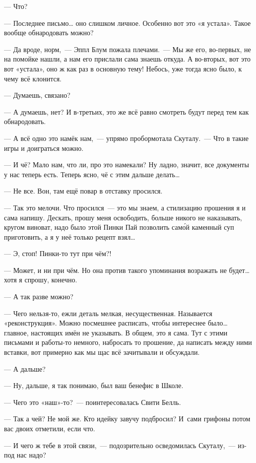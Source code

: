 \documentclass[fontsize=11pt,a5paper,titlepage=firstcover]{scrbook}
\begin{document}
--- Что?

--- Последнее письмо{\ldots} оно слишком личное. Особенно вот это «я устала». Такое вообще обнародовать можно?

--- Да вроде, норм,~--- Эппл Блум пожала плечами.~--- Мы же его, во-первых, не на помойке нашли, а нам его прислали сама знаешь откуда. А во-вторых, вот это вот «устала», оно ж как раз в основную тему! Небось, уже тогда ясно было, к чему всё клонится.

--- Думаешь, связано?

--- А думаешь, нет? И в-третьих, это же всё равно смотреть будут перед тем как обнародовать.

--- А всё одно это намёк нам,~--- упрямо пробормотала Скуталу.~--- Что в такие игры и доиграться можно.

--- И чё? Мало нам, что ли, про это намекали? Ну ладно, значит, все документы у нас теперь есть. Теперь ясно, чё с этим дальше делать{\ldots}

--- Не все. Вон, там ещё повар в отставку просился.

--- Так это мелочи. Что просился~--- это мы знаем, а стилизацию прошения я и сама напишу. Дескать, прошу меня освободить, больше никого не наказывать, кругом виноват, надо было этой Пинки Пай позволить само́й каменный суп приготовить, а я у неё только рецепт взял{\ldots}

--- Э, стоп! Пинки-то тут при чём?!

--- Может, и ни при чём. Но она против такого упоминания возражать не будет{\ldots} хотя я спрошу, конечно.

--- А так разве можно?

--- Чего нельзя-то, ежли деталь мелкая, несущественная. Называется «реконструкция». Можно посмешнее расписать, чтобы интереснее было{\ldots} главное, настоящих имён не указывать. В общем, это я сама. Тут с этими письмами и работы-то немного, набросать то прошение, да написать между ними вставки, вот примерно как мы щас всё зачитывали и обсуждали.

--- А дальше?

--- Ну, дальше, я так понимаю, был ваш бенефис в Школе.

--- Чего это «наш»-то?~--- поинтересовалась Свити Белль.

--- Так а чей? Не мой же. Кто идейку завучу подбросил? И~сами грифоны потом вас двоих отметили, если что.

--- И чего ж тебе в этой связи,~--- подозрительно осведомилась Скуталу,~--- из-под нас надо?
\end{document}
